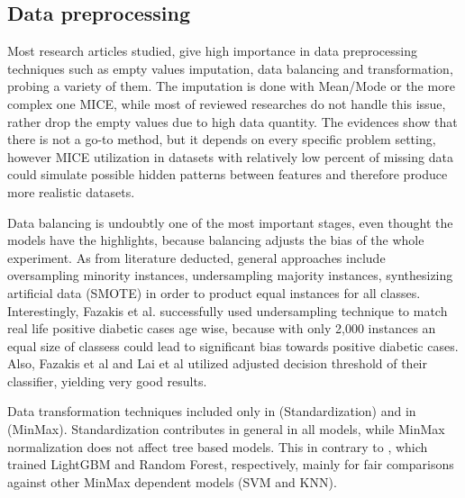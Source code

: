 \documentclass[journal,article,submit,pdftex,moreauthors]{Definitions/mdpi}
\begin{document}
\subsection{Data preprocessing}
Most research articles studied, give high importance in data preprocessing techniques such as empty values imputation, data balancing and
transformation, probing a variety of them.
The imputation is done with Mean/Mode or the more complex one MICE, while 
most of reviewed researches do not handle this issue, rather drop the empty values due to high data quantity. The evidences show 
that there is not a go-to method, but it depends on every specific problem setting, however MICE utilization in datasets with 
relatively low percent of missing data could simulate possible hidden patterns between features and therefore produce more realistic 
datasets.
\par Data balancing is undoubtly one of the most important stages, even thought the models have the highlights, because balancing
adjusts  the bias of the whole experiment. As from literature deducted, general approaches include oversampling minority instances,
undersampling majority instances, synthesizing artificial data (SMOTE) in order to product equal instances for all classes.
Interestingly, Fazakis et al. \cite{fazakis} successfully used undersampling technique to match real life positive diabetic cases age wise,
because with only 2,000 instances an equal size of classess could lead to significant bias towards positive diabetic cases. Also, 
Fazakis et al \cite{fazakis} and Lai et al \cite{Lai} utilized adjusted decision threshold of their classifier, yielding very good
results. 

\par Data transformation techniques included only in \cite{Dinh,Benita} (Standardization) and in \cite{Rufo,computation11050096}(MinMax).
Standardization contributes in general in all models, while MinMax normalization does not affect tree based models. This in 
contrary to \cite{Rufo,computation11050096}, which trained LightGBM and Random Forest, respectively, mainly for fair comparisons
against other MinMax dependent  models (SVM and KNN).
\end{document}
